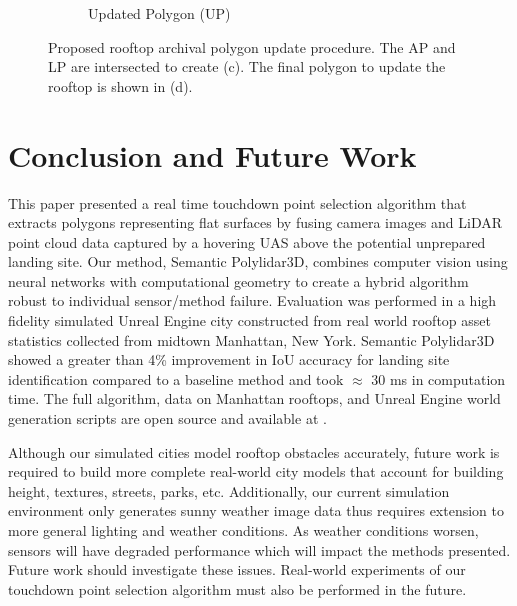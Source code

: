 \begin{figure}[ht]
\begin{subfigure}[t]{.30\linewidth}
    \caption{Updated Polygon (UP)\label{fig:ch6_map_update_d}}
  \end{subfigure}
  \caption[Proposed rooftop archival polygon update procedure]{Proposed rooftop archival polygon update procedure. The AP and LP are intersected to create (c). The final polygon to update the rooftop is shown in (d).  }\label{fig:ch6_map_upate}
\end{figure}


\section{Conclusion and Future Work}\label{sec:ch6_conclusions}

This paper presented a real time touchdown point selection algorithm that extracts polygons representing flat surfaces by fusing camera images and LiDAR point cloud data captured by a hovering UAS above the potential unprepared landing site. 
Our method, Semantic Polylidar3D, combines computer vision using neural networks with computational geometry to create a hybrid algorithm robust to individual sensor/method failure. Evaluation was performed in a high fidelity simulated Unreal Engine city constructed from real world rooftop asset statistics collected from midtown Manhattan, New York. Semantic Polylidar3D showed a greater than 4\% improvement in IoU accuracy for landing site identification compared to a baseline method and took  $\approx$ 30 ms in computation time. The full algorithm, data on Manhattan rooftops, and Unreal Engine world generation scripts are open source and available at \cite{Castagno_Github_UnrealLanding}.

Although our simulated cities model rooftop obstacles accurately, future work is required to build more complete real-world city models that account for building height, textures, streets, parks,  etc. Additionally, our current simulation environment only generates sunny weather image data thus requires extension to more general lighting and weather conditions. As weather conditions worsen, sensors will have degraded performance which will impact the methods presented. Future work should investigate these issues.  Real-world experiments of our touchdown point selection algorithm must also be performed in the future.